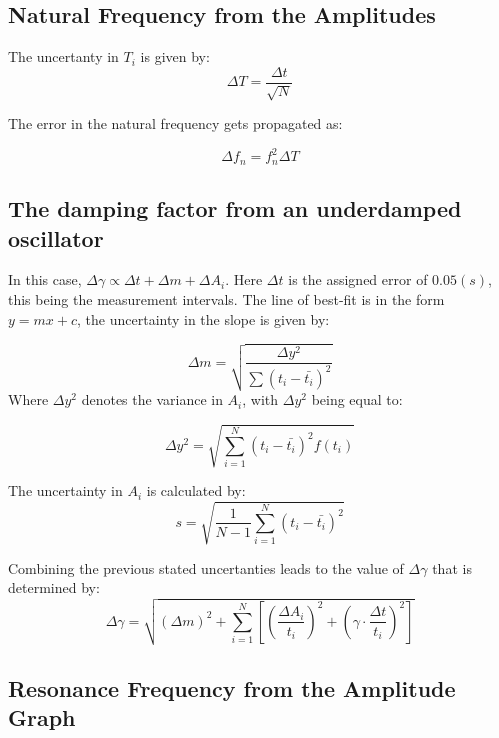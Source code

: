 \subsection{Natural Frequency from the Amplitudes} \label{appendix:errors:fn_amplitude}

The uncertanty in $T_i$ is given by:
\begin{equation}
  \Delta T = \frac{\Delta t}{\sqrt{N}}
\end{equation}

The error in the natural frequency gets propagated as:

\begin{equation}
  \Delta f_n = f_n^2\Delta T 
\end{equation}

\subsection{The damping factor from an underdamped oscillator}
In this case, $\Delta \gamma \propto \Delta t +\Delta m + \Delta A_i$. Here $\Delta t$ is the assigned error of $0.05(s)$, this being the measurement intervals. The line of best-fit is in the form $y=mx+c$, the uncertainty in the slope is given by:

\begin{equation*}
  \Delta m = \sqrt{\frac{\Delta y^2}{\sum (t_i - \bar{t_i})^2}}
\end{equation*}
Where $\Delta y^2$ denotes the variance in $A_i$, with $\Delta y^2$ being equal to:

\begin{equation*}
\Delta y^2 = \sqrt{\sum_{i=1}^{N} {(t_i - \bar{t_i})^2}{f(t_i)}}
\end{equation*}

The uncertainty in $A_i$ is calculated by:
\begin{equation*}
  s = \sqrt{\frac{1}{N-1}\sum_{i = 1}^{N}(t_i - \bar{t_i})^2}
\end{equation*}

Combining the previous stated uncertanties leads to the value of $\Delta \gamma$ that is determined by:
\begin{equation*}
  \Delta \gamma = \sqrt{(\Delta m)^2 + \sum_{i=1}^{N} \left[ \left( \frac{\Delta A_i}{t_i} \right)^2 + \left( \gamma \cdot \frac{\Delta t}{t_i} \right)^2 \right]}
\end{equation*}

\subsection{ Resonance Frequency from the Amplitude Graph } \label{appendix:errors:res_ampl}

